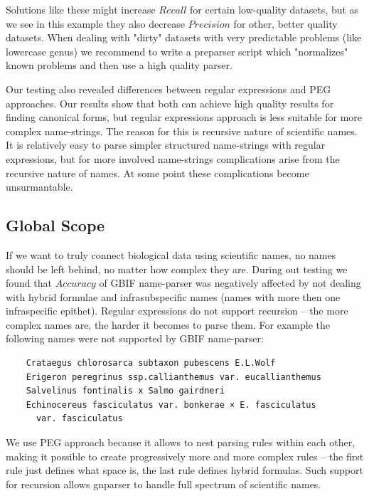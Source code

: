 \documentclass{bmcart}
\begin{document}
Solutions like these might increase $Recall$ for certain low-quality datasets,
but as we see in this example they also decrease $Precision$ for other, better
quality datasets. When dealing with "dirty" datasets with very predictable
problems (like lowercase genus) we recommend to write a preparser script which
"normalizes" known problems and then use a high quality parser.

Our testing also revealed differences between regular expressions and PEG
approaches. Our results show that both can achieve high quality results for
finding canonical forms, but regular expressions approach is less suitable for
more complex name-strings. The reason for this is recursive nature of
scientific names.  It is relatively easy to parse simpler structured
name-strings with regular expressions, but for more involved name-strings
complications arise from the recursive nature of names. At some point these
complications become unsurmantable.

\subsection*{Global Scope}

If we want to truly connect biological data using scientific names, no names
should be left behind, no matter how complex they are. During out testing we
found that $Accuracy$ of GBIF name-parser was negatively affected by not
dealing with hybrid formulae and infrasubspecific names (names with more then
one infraspecific epithet). Regular expressions do not support recursion --
the more complex names are, the harder it becomes to parse them. For example
the following names were not supported by GBIF name-parser:

\vspace{0.5cm}
\begin{verbatim}
    Crataegus chlorosarca subtaxon pubescens E.L.Wolf
    Erigeron peregrinus ssp.callianthemus var. eucallianthemus
    Salvelinus fontinalis x Salmo gairdneri
    Echinocereus fasciculatus var. bonkerae × E. fasciculatus
      var. fasciculatus
\end{verbatim}
\vspace{0.5cm}

We use PEG approach because it allows to nest parsing rules within each other,
making it possible to create progressively more and more complex rules -- the
first rule just defines what space is, the last rule defines hybrid formulas.
Such support for recursion allows gnparser to handle full spectrum of
scientific names.
\end{document}
